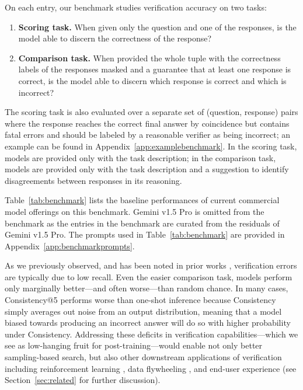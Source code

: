 \noindent\begin{minipage}{\textwidth}
\label{fig:example}
\vspace{0.4cm}
\end{minipage}

\noindent
On each entry, our benchmark studies verification accuracy on two tasks:
\begin{enumerate}
    \item \textbf{Scoring task.} When given only the question and one of the responses, is the model able to discern the correctness of the response?
    \item \textbf{Comparison task.} When provided the whole tuple with the correctness labels of the responses masked and a guarantee that at least one response is correct, is the model able to discern which response is correct and which is incorrect?
\end{enumerate}

\noindent
The scoring task is also evaluated over a separate set of (question, response) pairs where the response reaches the correct final answer by coincidence but contains fatal errors and should be labeled by a reasonable verifier as being incorrect; an example can be found in Appendix~\ref{app:examplebenchmark}.
In the scoring task, models are provided only with the task description; in the comparison task, models are provided only with the task description and a suggestion to identify disagreements between responses in its reasoning.

Table~\ref{tab:benchmark} lists the baseline performances of current commercial model offerings on this benchmark.
Gemini v1.5 Pro is omitted from the benchmark as the entries in the benchmark are curated from the residuals of Gemini v1.5 Pro.
The prompts used in Table~\ref{tab:benchmark} are provided in Appendix~\ref{app:benchmarkprompts}.

As we previously observed, and has been noted in prior works \citep{tyen_llms_2024, kamoi_evaluating_2024}, verification errors are typically due to low recall.
Even the easier comparison task, models perform only marginally better---and often worse---than random chance.
In many cases, Consistency@5 performs worse than one-shot inference because Consistency simply averages out noise from an output distribution, meaning that a model biased towards producing an incorrect answer will do so with higher probability under Consistency.
Addressing these deficits in verification capabilities---which we see as low-hanging fruit for post-training---would enable not only better sampling-based search, but also other downstream applications of verification including reinforcement learning \citep[e.g.][]{o1-preview,deepseekai2025deepseekr1incentivizingreasoningcapability}, data flywheeling \citep[e.g.,][]{welleck_generating_2022}, and end-user experience (see Section~\ref{sec:related} for further discussion).


